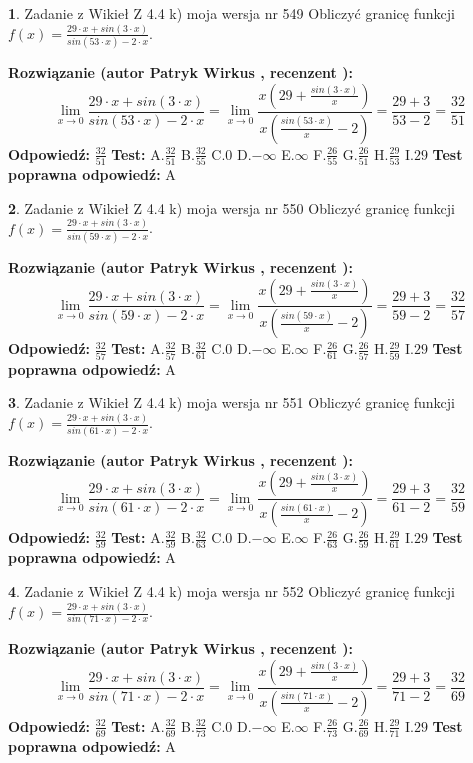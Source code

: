 \documentclass[12pt, a4paper]{article}
\theoremstyle{definition} %
\newtheorem{zad}{}
\newcommand{\zadStart}[1]{\begin{zad}#1\newline}
\newcommand{\zadStop}{\end{zad}}
\newcommand{\rozwStart}[2]{\noindent \textbf{Rozwiązanie (autor #1 , recenzent #2): }\newline}
\newcommand{\rozwStop}{\newline}
\newcommand{\odpStart}{\noindent \textbf{Odpowiedź:}\newline}
\newcommand{\odpStop}{\newline}
\newcommand{\testStart}{\noindent \textbf{Test:}\newline}
\newcommand{\testStop}{\newline}
\newcommand{\kluczStart}{\noindent \textbf{Test poprawna odpowiedź:}\newline}
\newcommand{\kluczStop}{\newline}
\begin{document}
\zadStart{Zadanie z Wikieł Z 4.4 k) moja wersja nr 549}
Obliczyć granicę funkcji $f(x)=\frac{29\cdot x +sin(3\cdot x)}{sin(53\cdot x) -2\cdot x}$.
\zadStop
\rozwStart{Patryk Wirkus}{}
$$\lim\limits_{x\to 0}\frac{29\cdot x +sin(3\cdot x)}{sin(53\cdot x) -2\cdot x}
=\lim\limits_{x\to 0}\frac{x(29+\frac{sin(3\cdot x)}{x})}{x(\frac{sin(53\cdot x)}{x}-2)}
=\frac{29+3}{53-2} = \frac{32}{51}$$
\rozwStop
\odpStart
$\frac{32}{51}$
\odpStop
\testStart
A.$\frac{32}{51}$
B.$\frac{32}{55}$
C.$0$
D.$-\infty$
E.$\infty$
F.$\frac{26}{55}$
G.$\frac{26}{51}$
H.$\frac{29}{53}$
I.$29$
\testStop
\kluczStart
A
\kluczStop



\zadStart{Zadanie z Wikieł Z 4.4 k) moja wersja nr 550}
Obliczyć granicę funkcji $f(x)=\frac{29\cdot x +sin(3\cdot x)}{sin(59\cdot x) -2\cdot x}$.
\zadStop
\rozwStart{Patryk Wirkus}{}
$$\lim\limits_{x\to 0}\frac{29\cdot x +sin(3\cdot x)}{sin(59\cdot x) -2\cdot x}
=\lim\limits_{x\to 0}\frac{x(29+\frac{sin(3\cdot x)}{x})}{x(\frac{sin(59\cdot x)}{x}-2)}
=\frac{29+3}{59-2} = \frac{32}{57}$$
\rozwStop
\odpStart
$\frac{32}{57}$
\odpStop
\testStart
A.$\frac{32}{57}$
B.$\frac{32}{61}$
C.$0$
D.$-\infty$
E.$\infty$
F.$\frac{26}{61}$
G.$\frac{26}{57}$
H.$\frac{29}{59}$
I.$29$
\testStop
\kluczStart
A
\kluczStop



\zadStart{Zadanie z Wikieł Z 4.4 k) moja wersja nr 551}
Obliczyć granicę funkcji $f(x)=\frac{29\cdot x +sin(3\cdot x)}{sin(61\cdot x) -2\cdot x}$.
\zadStop
\rozwStart{Patryk Wirkus}{}
$$\lim\limits_{x\to 0}\frac{29\cdot x +sin(3\cdot x)}{sin(61\cdot x) -2\cdot x}
=\lim\limits_{x\to 0}\frac{x(29+\frac{sin(3\cdot x)}{x})}{x(\frac{sin(61\cdot x)}{x}-2)}
=\frac{29+3}{61-2} = \frac{32}{59}$$
\rozwStop
\odpStart
$\frac{32}{59}$
\odpStop
\testStart
A.$\frac{32}{59}$
B.$\frac{32}{63}$
C.$0$
D.$-\infty$
E.$\infty$
F.$\frac{26}{63}$
G.$\frac{26}{59}$
H.$\frac{29}{61}$
I.$29$
\testStop
\kluczStart
A
\kluczStop



\zadStart{Zadanie z Wikieł Z 4.4 k) moja wersja nr 552}
Obliczyć granicę funkcji $f(x)=\frac{29\cdot x +sin(3\cdot x)}{sin(71\cdot x) -2\cdot x}$.
\zadStop
\rozwStart{Patryk Wirkus}{}
$$\lim\limits_{x\to 0}\frac{29\cdot x +sin(3\cdot x)}{sin(71\cdot x) -2\cdot x}
=\lim\limits_{x\to 0}\frac{x(29+\frac{sin(3\cdot x)}{x})}{x(\frac{sin(71\cdot x)}{x}-2)}
=\frac{29+3}{71-2} = \frac{32}{69}$$
\rozwStop
\odpStart
$\frac{32}{69}$
\odpStop
\testStart
A.$\frac{32}{69}$
B.$\frac{32}{73}$
C.$0$
D.$-\infty$
E.$\infty$
F.$\frac{26}{73}$
G.$\frac{26}{69}$
H.$\frac{29}{71}$
I.$29$
\testStop
\kluczStart
A
\kluczStop
\end{document}
